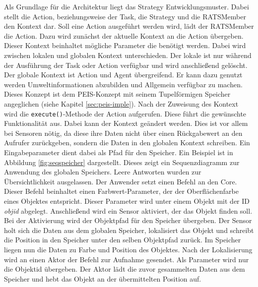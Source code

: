 Als Grundlage für die Architektur liegt das Strategy Entwicklungsmuster. Dabei stellt die Action, beziehungsweise der Task, die Strategy und die RATSMember den Kontext dar. Soll eine Action ausgeführt werden wird, lädt der RATSMember die Action. Dazu wird zunächst der aktuelle Kontext an die Action übergeben. Dieser Kontext beinhaltet mögliche Parameter die benötigt werden. Dabei wird zwischen lokalen und globalen Kontext unterschieden. Der lokale ist nur während der Ausführung der Task oder Action verfügbar und wird anschließend gelöscht. Der globale Kontext ist Action und Agent übergreifend. Er kann dazu genutzt werden Umweltinformationen abzubilden und Allgemein verfügbar zu machen. Dieses Konzept ist dem PEIS-Konzept mit seinem Tupelförmigen Speicher angeglichen (siehe Kapitel \ref{sec:peis-imple}). Nach der Zuweisung des Kontext wird die \lstinline|execute()|-Methode der Action aufgerufen. Diese führt die gewünschte Funktionalität aus. Dabei kann der Kontext geändert werden. Dies ist vor allem bei Sensoren nötig, da diese ihre Daten nicht über einen Rückgabewert an den Aufrufer zurückgeben, sondern die Daten in den globalen Kontext schreiben. Ein Eingabeparameter dient dabei als Pfad für den Speicher. Ein Beispiel ist in Abbildung \ref{fig:seqspeicher} dargestellt. Dieses zeigt ein Sequenzdiagramm zur Anwendung des globalen Speichers. Leere Antworten wurden zur Übersichtlichkeit ausgelassen. Der Anwender setzt einen Befehl an den Core. Dieser Befehl beinhaltet einen Farbwert-Parameter, der der Oberflächenfarbe eines Objektes entspricht. Dieser Parameter wird unter einem Objekt mit der ID \textit{objid} abgelegt. Anschließend wird ein Sensor aktiviert, der das Objekt finden soll. Bei der Aktivierung wird der Objektpfad für den Speicher übergeben. Der Sensor holt sich die Daten aus dem globalen Speicher, lokalisiert das Objekt und schreibt die Position in den Speicher unter den selben Objektpfad zurück. Im Speicher liegen nun die Daten zu Farbe und Position des Objektes. Nach der Lokalisierung wird an einen Aktor der Befehl zur Aufnahme gesendet. Als Parameter wird nur die Objektid übergeben. Der Aktor lädt die zuvor gesammelten Daten aus dem Speicher und hebt das Objekt an der übermittelten Position auf.

